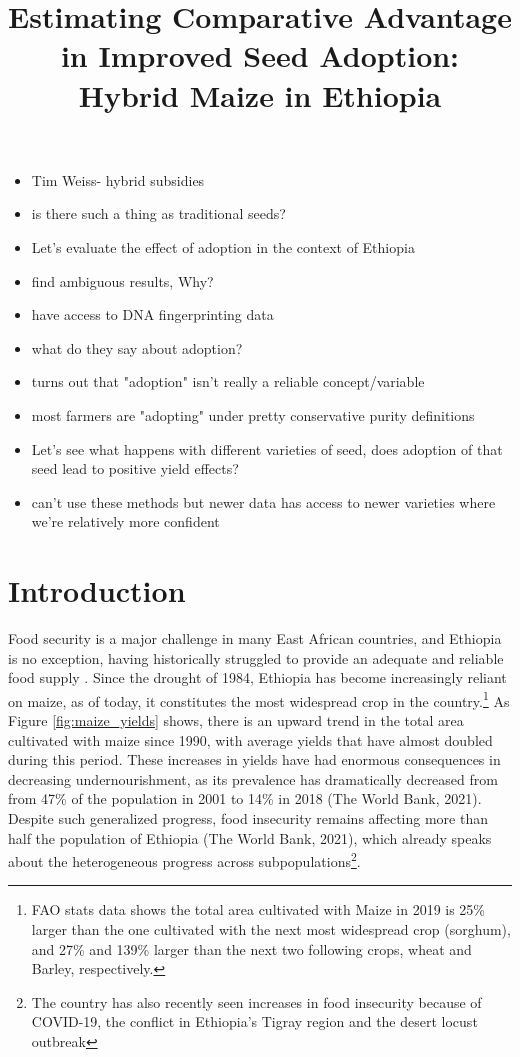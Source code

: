 \documentclass{article}
\title{Estimating Comparative Advantage in Improved Seed Adoption: Hybrid Maize in Ethiopia}
\begin{document}
\maketitle



\begin{itemize}
    \item Tim Weiss- hybrid subsidies
    \item is there such a thing as traditional seeds?
    
    \item Let's evaluate the effect of adoption in the context of Ethiopia
    \item find ambiguous results, Why?
    \item have access to DNA fingerprinting data
    \item what do they say about adoption?
    \item turns out that "adoption" isn't really a reliable concept/variable
    \item most farmers are "adopting" under pretty conservative purity definitions
    \item Let's see what happens with different varieties of seed, does adoption of that seed lead to positive yield effects?
    \item can't use these methods but newer data has access to newer varieties where we're relatively more confident
\end{itemize}

\section{Introduction}

Food security is a major challenge in many East African countries, and Ethiopia is no exception, having historically struggled to provide an adequate and reliable food supply \citep{Ramakrishna2002-hv, Jaleta2018-oj}. Since the drought of 1984, Ethiopia has become increasingly reliant on maize, as of today, it constitutes the most widespread crop in the country.\footnote{FAO stats data shows the total area cultivated with Maize in 2019 is 25\% larger than the one cultivated with the next most widespread crop (sorghum), and 27\% and 139\% larger than the next two following crops, wheat and Barley, respectively.} As Figure \ref{fig:maize_yields} shows, there is an upward trend in the total area cultivated with maize since 1990, with average yields that have almost doubled during this period. These increases in yields have had enormous consequences in decreasing undernourishment, as its prevalence has dramatically decreased from from 47\% of the population in 2001 to 14\% in 2018 (The World Bank, 2021). Despite such generalized progress, food insecurity remains affecting more than half the population of Ethiopia (The World Bank, 2021), which already speaks about the heterogeneous progress across subpopulations\footnote{The country has also recently seen increases in food insecurity because of COVID-19, the conflict in Ethiopia’s Tigray region and the desert locust outbreak}.   
\end{document}
